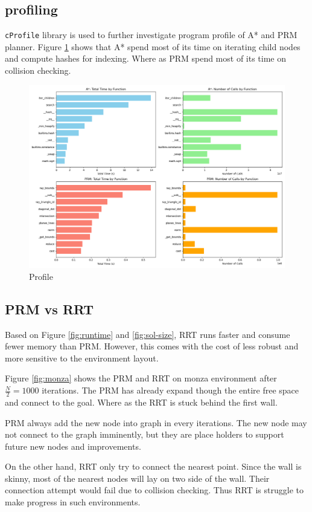 \documentclass[conference]{IEEEtran}
\begin{document}
\subsection{profiling}
\texttt{cProfile} library is used to further investigate program profile of A* and PRM planner.
Figure \ref{fig:profile} shows that 
A* spend most of its time on iterating child nodes and compute hashes for indexing.
Where as PRM spend most of its time on collision checking.

\begin{figure}
    \centering
    \includegraphics[width=0.8\linewidth]{img/profile.png}
    \caption{Profile}
    \label{fig:profile}
\end{figure}

\subsection{PRM vs RRT}
Based on Figure \ref{fig:runtime} and \ref{fig:sol-size},
RRT runs faster and consume fewer memory than PRM.
However, this comes with the cost of less robust and more sensitive 
to the environment layout.

Figure \ref{fig:monza} shows the PRM and RRT on monza environment 
after $\frac{N}{2} = 1000$ iterations.
The PRM has already expand though the entire free space and connect to the goal.
Where as the RRT is stuck behind the first wall.

PRM always add the new node into graph in every iterations.
The new node may not connect to the graph imminently, 
but they are place holders to support future new nodes and improvements.

On the other hand, RRT only try to connect the nearest point.
Since the wall is skinny, 
most of the nearest nodes will lay on two side of the wall.
Their connection attempt would fail due to collision checking.
Thus RRT is struggle to make progress in such environments.
\end{document}
